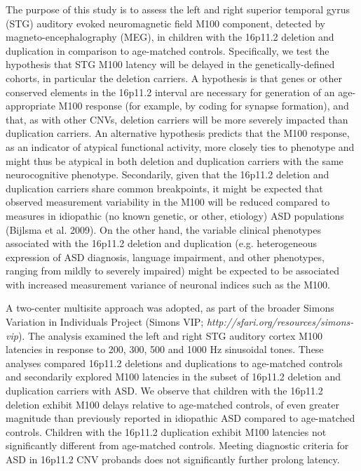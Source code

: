 \documentclass{article}
\begin{document}
The purpose of this study is to assess the left and right superior temporal gyrus (STG) auditory evoked neuromagnetic field M100 component, detected by magneto-encephalography (MEG), in children with the 16p11.2 deletion and duplication in comparison to age-matched controls. Specifically, we test the hypothesis that STG M100 latency will be delayed in the genetically-defined cohorts, in particular the deletion carriers. A hypothesis is that genes or other conserved elements in the 16p11.2 interval are necessary for generation of an age-appropriate M100 response (for example, by coding for synapse formation), and that, as with other CNVs, deletion carriers will be more severely impacted than duplication carriers. An alternative hypothesis predicts that the M100 response, as an indicator of atypical functional activity, more closely ties to phenotype and might thus be atypical in both deletion and duplication carriers with the same neurocognitive phenotype. Secondarily, given that the 16p11.2 deletion and duplication carriers share common breakpoints, it might be expected that observed measurement variability in the M100 will be reduced compared to measures in idiopathic (no known genetic, or other, etiology) ASD populations (Bijlsma et al. 2009). On the other hand, the variable clinical phenotypes associated with the 16p11.2 deletion and duplication (e.g. heterogeneous expression of ASD diagnosis, language impairment, and other phenotypes, ranging from mildly to severely impaired) might be expected to be associated with increased measurement variance of neuronal indices such as the M100.  

\medskip

A two-center multisite approach was adopted, as part of the broader Simons Variation in Individuals Project (Simons VIP; \emph{http://sfari.org/resources/simons-vip}). The analysis examined the left and right STG auditory cortex M100 latencies in response to 200, 300, 500 and 1000 Hz sinusoidal tones. These analyses compared 16p11.2 deletions and duplications to age-matched controls and secondarily explored M100 latencies in the subset of 16p11.2 deletion and duplication carriers with ASD.  We observe that children with the 16p11.2 deletion exhibit M100 delays relative to age-matched controls, of even greater magnitude than previously reported in idiopathic ASD compared to age-matched controls. Children with the 16p11.2 duplication exhibit M100 latencies not significantly different from age-matched controls. Meeting diagnostic criteria for ASD in 16p11.2 CNV probands does not significantly further prolong latency.  
\end{document}
